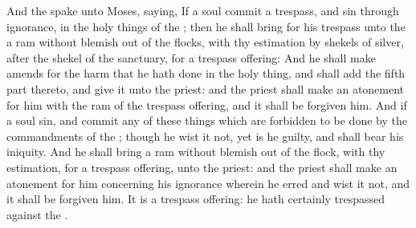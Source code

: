 \begin{biblechapter}
\vfill\columnbreak %
 And the \LORD spake unto Moses, saying,
\verse If a soul commit a trespass, and sin through ignorance, in the holy things of the \LORD; then he shall bring for his trespass unto the \LORD a ram without blemish out of the flocks, with thy estimation by shekels of silver, after the shekel of the sanctuary, for a trespass offering:
\verse And he shall make amends for the harm that he hath done in the holy thing, and shall add the fifth part thereto, and give it unto the priest: and the priest shall make an atonement for him with the ram of the trespass offering, and it shall be forgiven him.
\verse And if a soul sin, and commit any of these things which are forbidden to be done by the commandments of the \LORD; though he wist it not, yet is he guilty, and shall bear his iniquity.
\verse And he shall bring a ram without blemish out of the flock, with thy estimation, for a trespass offering, unto the priest: and the priest shall make an atonement for him concerning his ignorance wherein he erred and wist it not, and it shall be forgiven him.
\verse It is a trespass offering: he hath certainly trespassed against the \LORD.
\end{biblechapter}

